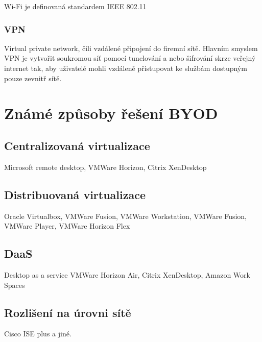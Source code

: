  Wi-Fi je definovaná standardem IEEE 802.11
 
 \subsubsection{VPN} 
 Virtual private network, čili vzdálené připojení do firemní sítě. Hlavním smyslem VPN je vytvořit soukromou síť pomocí tunelování a nebo šifrování skrze veřejný internet tak, aby uživatelé mohli vzdáleně přistupovat ke službám dostupným pouze zevnitř sítě.
 
 
 
 
 
 \section{Známé způsoby řešení BYOD}

 
 \subsection{Centralizovaná virtualizace}
 Microsoft remote desktop, VMWare Horizon, Citrix XenDesktop
 
 
 \subsection{Distribuovaná virtualizace}
 Oracle Virtualbox, VMWare Fusion, VMWare Workstation, VMWare Fusion, VMWare Player, VMWare Horizon Flex
 
 
 \subsection{DaaS}
 Desktop as a service
 VMWare Horizon Air, Citrix XenDesktop, Amazon Work Spaces
 
 
 \subsection{Rozlišení na úrovni sítě}
 Cisco ISE plus a jiné. 
 
